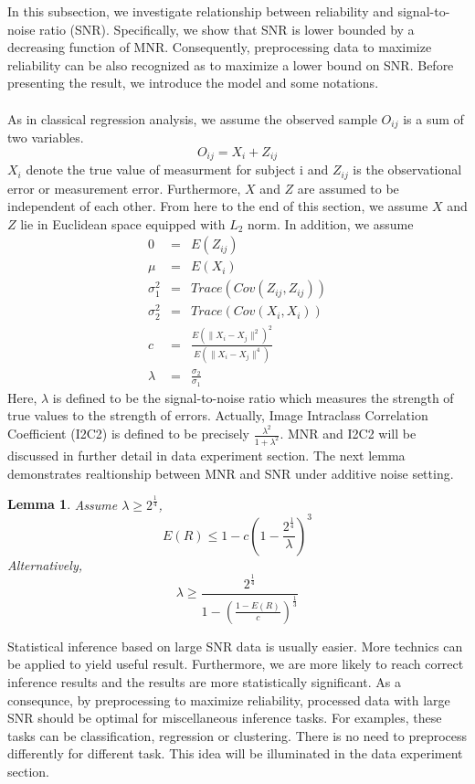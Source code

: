 \documentclass[11pt,journal,compsoc]{IEEEtran}
\newtheorem{lemma}{Lemma}
\begin{document}
In this subsection, we investigate relationship between reliability and signal-to-noise ratio (SNR). Specifically, we show that SNR is lower bounded by a decreasing function of MNR. Consequently, preprocessing data to maximize reliability can be also recognized as to maximize a lower bound on SNR. Before presenting the result, we introduce the model and some notations. \\
\\
As in classical regression analysis, we assume the observed sample $O_{ij}$ is a sum of two variables.
\[O_{ij}=X_i+Z_{ij}\]
$X_i$ denote the true value of measurment for subject i and $Z_{ij}$ is the observational error or measurement error. Furthermore, $X$ and $Z$ are assumed to be independent of each other. From here to the end of this section, we assume $X$ and $Z$ lie in Euclidean space equipped with $L_2$ norm. In addition, we assume 
\begin{eqnarray*}
0&=& E(Z_{ij}) \\
\mu &=&E(X_i)\\
\sigma_1^2&=&Trace(Cov(Z_{ij},Z_{ij})) \\
\sigma_2^2&=&Trace(Cov(X_{i},X_{i}))\\
c&=&\frac{E(\|X_i-X_j \|^2)^2}{E(\|X_i-X_j \|^4)} \\
\lambda&=&\frac{\sigma_2}{\sigma_1} 
\end{eqnarray*}
Here, $\lambda$ is defined to be the signal-to-noise ratio which measures the strength of true values to the strength of errors. Actually, Image Intraclass Correlation Coefficient (I2C2) is defined to be precisely $\frac{\lambda^2}{1+\lambda^2}$. MNR and I2C2 will be discussed in further detail in data experiment section. The next lemma demonstrates realtionship between MNR and SNR under additive noise setting.

\begin{lemma} 
Assume $\lambda \geq 2^{\frac{1}{4}}$, 
\[E(R) \leq 1-c(1-\frac{2^{\frac{1}{4}}}{\lambda})^3 \] 
Alternatively,
\[\lambda \geq \frac{2^{\frac{1}{4}}}{1-(\frac{1-E(R)}{c})^{\frac{1}{3}}} \]
\end{lemma}
\noindent Statistical inference based on large SNR data is usually easier. More technics can be applied to yield useful result. Furthermore, we are more likely to reach correct inference results and the results are more statistically significant. As a consequnce, by preprocessing to maximize reliability, processed data with large SNR should be optimal for miscellaneous inference tasks. For examples, these tasks can be classification, regression or clustering. There is no need to preprocess differently for different task. This idea will be illuminated in the data experiment section.
\end{document}
